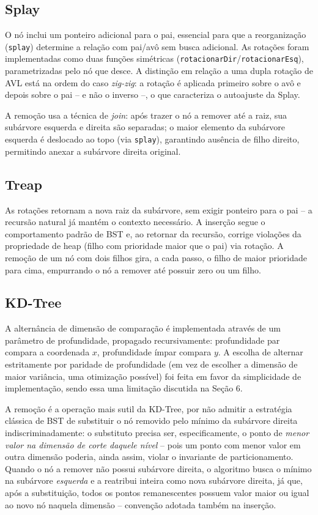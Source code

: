 \documentclass[11pt]{article}
\begin{document}
\subsection{Splay}

O nó inclui um ponteiro adicional para o pai, essencial para que a
reorganização (\texttt{splay}) determine a relação com pai/avô sem busca
adicional. As rotações foram implementadas como duas funções simétricas
(\texttt{rotacionarDir}/\texttt{rotacionarEsq}), parametrizadas pelo nó que
desce. A distinção em relação a uma dupla rotação de AVL está na ordem do caso
\textit{zig-zig}: a rotação é aplicada primeiro sobre o avô e depois sobre o
pai -- e não o inverso --, o que caracteriza o autoajuste da Splay.

A remoção usa a técnica de \textit{join}: após trazer o nó a remover até a
raiz, sua subárvore esquerda e direita são separadas; o maior elemento da
subárvore esquerda é deslocado ao topo (via \texttt{splay}), garantindo
ausência de filho direito, permitindo anexar a subárvore direita original.

\subsection{Treap}

As rotações retornam a nova raiz da subárvore, sem exigir ponteiro para o pai
-- a recursão natural já mantém o contexto necessário. A inserção segue o
comportamento padrão de BST e, ao retornar da recursão, corrige violações da
propriedade de heap (filho com prioridade maior que o pai) via rotação. A
remoção de um nó com dois filhos gira, a cada passo, o filho de maior
prioridade para cima, empurrando o nó a remover até possuir zero ou um filho.

\subsection{KD-Tree}

A alternância de dimensão de comparação é implementada através de um parâmetro
de profundidade, propagado recursivamente: profundidade par compara a
coordenada $x$, profundidade ímpar compara $y$. A escolha de alternar
estritamente por paridade de profundidade (em vez de escolher a dimensão de
maior variância, uma otimização possível) foi feita em favor da simplicidade
de implementação, sendo essa uma limitação discutida na Seção 6.

A remoção é a operação mais sutil da KD-Tree, por não admitir a estratégia
clássica de BST de substituir o nó removido pelo mínimo da subárvore
direita indiscriminadamente: o substituto precisa ser, especificamente, o
ponto de \emph{menor valor na dimensão de corte daquele nível} -- pois um
ponto com menor valor em outra dimensão poderia, ainda assim, violar o
invariante de particionamento. Quando o nó a remover não possui subárvore
direita, o algoritmo busca o mínimo na subárvore \emph{esquerda} e a
reatribui inteira como nova subárvore direita, já que, após a substituição,
todos os pontos remanescentes possuem valor maior ou igual ao novo nó
naquela dimensão -- convenção adotada também na inserção.
\end{document}
